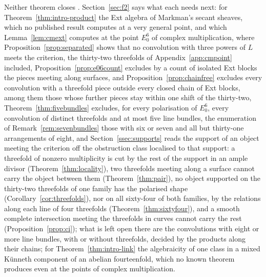 Neither theorem closes \Fii{}. Section~\ref{sec:f2} says what each needs next: for Theorem~\ref{thm:intro-product} the Ext algebra of Markman's secant sheaves, which no published result computes at a very general point, and which Lemma~\ref{lem:cmext} computes at the point $E_{0}^{6}$ of complex multiplication, where Proposition~\ref{prop:separated} shows that no convolution with three powers of $L$ meets the criterion, the thirty-two threefolds of Appendix~\ref{app:cmpoint} included, Proposition~\ref{prop:e06count} excludes by a count of isolated Ext blocks the pieces meeting along surfaces, and Proposition~\ref{prop:chainfree} excludes every convolution with a threefold piece outside every closed chain of Ext blocks, among them those whose further pieces stay within one shift of the thirty-two, Theorem~\ref{thm:fivebundles} excludes, for every polarisation of $E_{0}^{6}$, every convolution of distinct threefolds and at most five line bundles, the enumeration of Remark~\ref{rem:sevenbundles} those with six or seven and all but thirty-one arrangements of eight, and Section~\ref{ssec:supports} reads the support of an object meeting the criterion off the obstruction class localised to that support: a threefold of nonzero multiplicity is cut by the rest of the support in an ample divisor (Theorem~\ref{thm:locality}), two threefolds meeting along a surface cannot carry the object between them (Theorem~\ref{thm:pair}), no object supported on the thirty-two threefolds of one family has the polarised shape (Corollary~\ref{cor:threefolds}), nor on all sixty-four of both families, by the relations along each line of four threefolds (Theorem~\ref{thm:sixtyfour}), and a smooth complete intersection meeting the threefolds in curves cannot carry the rest (Proposition~\ref{prop:ci}); what is left open there are the convolutions with eight or more line bundles, with or without threefolds, decided by the products along their chains; for Theorem~\ref{thm:intro-link} the algebraicity of one class in a mixed K\"unneth component of an abelian fourteenfold, which no known theorem produces even at the points of complex multiplication.

